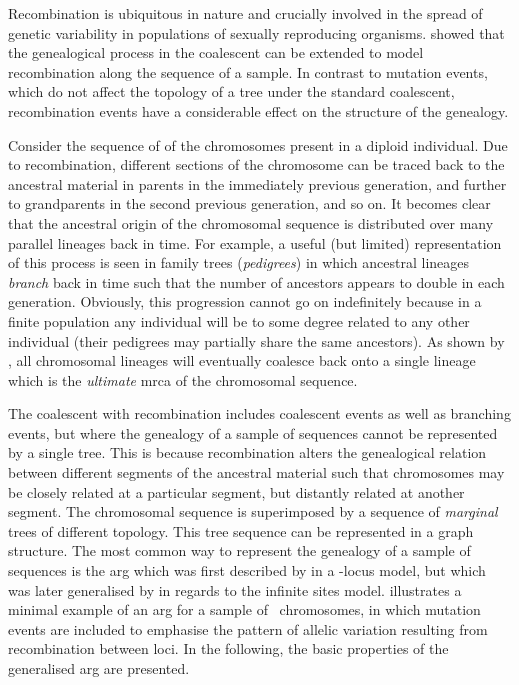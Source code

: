 Recombination is ubiquitous in nature and crucially involved in the spread of genetic variability in populations of sexually reproducing organisms.
 showed that the genealogical process in the coalescent can be extended to model recombination along the sequence of a sample.
In contrast to  mutation events, which do not affect the topology of a tree under the standard coalescent, recombination events have a considerable effect on the structure of the genealogy.

Consider the sequence of  of the chromosomes present in a diploid individual.
Due to recombination, different sections of the chromosome can be traced back to the ancestral material in  parents in the immediately previous generation, and further to  grandparents in the second previous generation, and so on.
It becomes clear that the ancestral origin of the chromosomal sequence is distributed over many parallel lineages back in time.
For example, a useful (but limited) representation of this process is seen in family trees (\emph{pedigrees}) in which ancestral lineages \emph{branch} back in time such that the number of ancestors appears to double in each generation.
Obviously, this progression cannot go on indefinitely because in a finite population any individual will be to some degree related to any other individual (their pedigrees may partially share the same ancestors).
As shown by \citet{Wiuf:1997wf}, all chromosomal lineages will eventually coalesce back onto a single lineage which is the \emph{ultimate} \gls{mrca} of the chromosomal sequence.

The coalescent with recombination includes coalescent events as well as branching events, but where the genealogy of a sample of sequences cannot be represented by a single tree.
This is because recombination alters the genealogical relation between different segments of the ancestral material such that  chromosomes may be closely related at a particular segment, but distantly related at another segment.
The chromosomal sequence is superimposed by a sequence of \emph{marginal} trees of different topology.
This tree sequence can be represented in a graph structure.
The most common way to represent the genealogy of a sample of sequences is the \gls{arg} which was first described by \citet{Griffiths:1991jp} in a -locus model, but which was later generalised by \citet{Griffiths:1996dx,griffiths1997} in regards to the infinite sites model.
 illustrates a minimal example of an \gls{arg} for a sample of ~chromosomes, in which mutation events are included to emphasise the pattern of allelic variation resulting from recombination between  loci.
In the following, the basic properties of the generalised \gls{arg} are presented.

